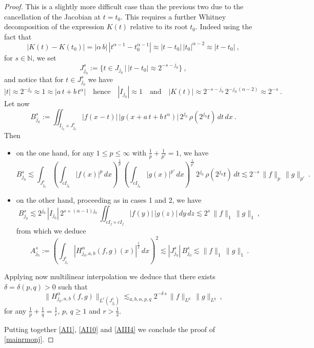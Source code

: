 \documentclass[a4paper,reqno]{amsart}
\numberwithin{equation}{section}
\theoremstyle{definition}
\newcommand{\N}{\mathbb{N}}
\def\a{\alpha}
\def\d{\delta}
\begin{document}
\begin{proof}
This is a slightly more difficult case than the previous two due to the cancellation of the Jacobian at $t=t_0$. This requires a further Whitney decomposition of the expression $K(t)$ relative to its root $t_0$. Indeed using the fact that
\begin{equation}\label{Ks}
|K(t)-K(t_0)|=|\a\,b|\,|t^{\a-1}-t_0^{\a-1}|\approx |t-t_0|\, |t_0|^{\a-2}\approx |t-t_0|\:,
\end{equation}
for $s\in\N$, we set
\begin{equation}\label{Ds}
J_{j_0}^{s}:=\{t\in J_{j_0}\,|\,|t-t_0|\approx 2^{-s-j_0}\}\:,
\end{equation}
and notice that for $t\in J_{j_0}^{s}$ we have
\begin{equation}\label{keyIII}
|t|\approx 2^{-j_0}\approx 1\approx|a\,t+b\,t^{\a}|\quad\textrm{hence}\quad |I_{j_0}|\approx 1\quad\textrm{and}\quad |K(t)|\approx 2^{-s-j_0}\,2^{-j_0\,(\a-2)}\approx 2^{-s}\:.
\end{equation}
Let now
\begin{equation}\label{AIII}
B_{j_0}^{s}:= \iint_{I_{j_0}\times J_{j_0}^s} |f(x-t)|\, |g(x+a\,t+b\,t^\a)|\,2^{j_0}\,\rho(2^{j_0} t)\,dt\,dx\:.
\end{equation}
Then
\begin{itemize}
\item on the one hand, for any $1\leq p\leq \infty$ with $\frac{1}{p}+\frac{1}{p'}=1$, we have
\begin{equation}\label{AIII1}
B_{j_0}^{s}\lesssim \int_{J_{j_0}^{s}} \left(\int_{c I_{j_0}} |f(x)|^p\,dx\right)^{\frac{1}{p}}\,\left(\int_{c I_{j_0}} |g(x)|^{p'}\,dx\right)^{\frac{1}{p'}}\,2^{j_0}\,\rho(2^{j_0} t)\,dt\lesssim 2^{-s}\,\|f\|_p\,\|g\|_{p'}\:.
\end{equation}

\item on the other hand, proceeding as in cases 1 and 2, we have
\begin{equation}\label{AIII2}
B_{j_0}^{s}\lesssim  2^{j_0}\,|I_{j_0}|\,2^{s+(\a-1)j_0}\,\iint_{c I_j\times c I_j} |f(y)|\, |g(z)|\,dy\,dz \lesssim 2^{s}\, \|f\|_1\,\|g\|_{1}\:,
\end{equation}
from which we deduce
\begin{equation}\label{AIII3}
A_{j_0}^{s}:=\left(\int_{J_{j_0}^{s}}|H_{j_0,a,b}^\a(f,g)(x)|^{\frac{1}{2}}\,dx\right)^2
	\lesssim |J_{j_0}^{s}|\,B_{j_0}^{s}\lesssim \|f\|_1\,\|g\|_{1}\,.
\end{equation}
\end{itemize}
Applying now multilinear interpolation we deduce that there exists $\d=\d(p,q)>0$ such that
\begin{equation}\label{AIII4}
		\|H_{j_0,a,b}^\a(f,g)\|_{L^r(J_{j_0}^{s})}\lesssim_{a,b,\a,p,q} 2^{-\d\,s}\,\|f\|_{L^p}\,\|g\|_{L^q}\:,
\end{equation}
for any $\frac{1}{p}+\frac{1}{q}=\frac{1}{r}$, $p,\,q\geq 1$ and $r>\frac{1}{2}$.

Putting together \eqref{AI1}, \eqref{AI10} and \eqref{AIII4} we conclude the proof of \eqref{mainrmonj}.
\end{proof}
\end{document}
